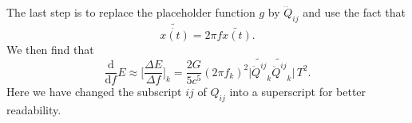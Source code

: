 The last step is to replace the placeholder function $g$ by $\dddot{Q}_{ij}$ and use the fact that
\begin{equation}
\widetilde{\dot{x(t)}} = 2\pi f \widetilde{x(t)}.  
\end{equation}
We then find that 
\begin{equation}
\frac{\mathrm{d}}{\mathrm{d} f} E \approx \Bigg[\frac{\Delta E}{\Delta f}\Bigg]_k =\frac{2G}{5 c^5} (2\pi f_k)^2 \big|\widetilde{\ddot{Q}^{ij}}_k \widetilde{\ddot{Q}^{ij}}_k| \, T^2.  
\end{equation}
Here we have changed the subscript $ij$ of $Q_{ij}$ into a superscript for better readability. 
